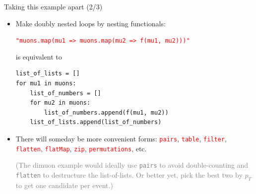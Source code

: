 \documentclass{beamer}
\begin{document}
\begin{frame}[fragile]{Taking this example apart (2/3)}
\begin{itemize}\setlength{\itemsep}{0.5 cm}
\item Make doubly nested loops by nesting functionals:

\mbox{\tt\small \textcolor{red}{"muons.map(mu1 => muons.map(mu2 => f(mu1, mu2)))"}\hspace{-1 cm}}

is equivalent to

\small
\begin{verbatim}
list_of_lists = []
for mu1 in muons:
    list_of_numbers = []
    for mu2 in muons:
        list_of_numbers.append(f(mu1, mu2))
    list_of_lists.append(list_of_numbers)
\end{verbatim}

\item There will someday be more convenient forms: \textcolor{red}{\tt pairs}, \textcolor{red}{\tt table}, \textcolor{red}{\tt filter}, \textcolor{red}{\tt flatten}, \textcolor{red}{\tt flatMap}, \textcolor{red}{\tt zip}, \textcolor{red}{\tt permutations}, etc.

\vspace{0.2 cm}
\textcolor{gray}{(The dimuon example would ideally use \textcolor{lightred}{\tt pairs} to avoid double-counting and \textcolor{lightred}{\tt flatten} to destructure the list-of-lists. Or better yet, pick the best two by $p_T$ to get one candidate per event.)}
\end{itemize}
\end{frame}
\end{document}
